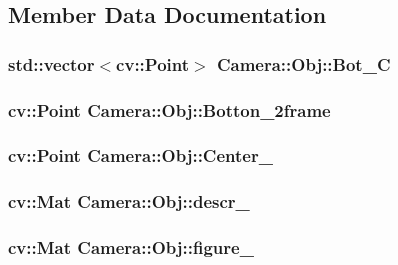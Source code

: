 \subsection{Member Data Documentation}
\hypertarget{structCamera_1_1Obj_ab1c3c43239ea355d03dd2ee0f006e575}{
\subsubsection[{Bot\-\_\-\-C}]{\setlength{\rightskip}{0pt plus 5cm}std\-::vector$<$cv\-::\-Point$>$ Camera\-::\-Obj\-::\-Bot\-\_\-\-C}}\label{structCamera_1_1Obj_ab1c3c43239ea355d03dd2ee0f006e575}
\hypertarget{structCamera_1_1Obj_af8eb4d67cacbe337a083160f75ec8cf3}{
\subsubsection[{Botton\-\_\-2frame}]{\setlength{\rightskip}{0pt plus 5cm}cv\-::\-Point Camera\-::\-Obj\-::\-Botton\-\_\-2frame}}\label{structCamera_1_1Obj_af8eb4d67cacbe337a083160f75ec8cf3}
\hypertarget{structCamera_1_1Obj_a69bc5e8437942fb1b855ade6191e2e02}{
\subsubsection[{Center\-\_\-}]{\setlength{\rightskip}{0pt plus 5cm}cv\-::\-Point Camera\-::\-Obj\-::\-Center\-\_\-}}\label{structCamera_1_1Obj_a69bc5e8437942fb1b855ade6191e2e02}
\hypertarget{structCamera_1_1Obj_a25ec00d27e34c3fc7e59d31486780048}{
\subsubsection[{descr\-\_\-}]{\setlength{\rightskip}{0pt plus 5cm}cv\-::\-Mat Camera\-::\-Obj\-::descr\-\_\-}}\label{structCamera_1_1Obj_a25ec00d27e34c3fc7e59d31486780048}
\hypertarget{structCamera_1_1Obj_af99c481da3a55632756ffc33ef1e02bd}{
\subsubsection[{figure\-\_\-}]{\setlength{\rightskip}{0pt plus 5cm}cv\-::\-Mat Camera\-::\-Obj\-::figure\-\_\-}}\label{structCamera_1_1Obj_af99c481da3a55632756ffc33ef1e02bd}
